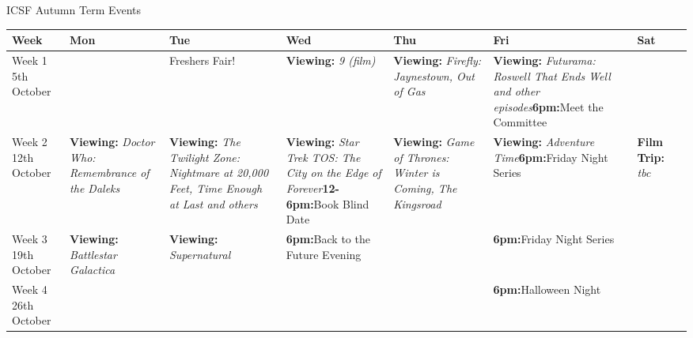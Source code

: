 \begin{landscape}
\noindent

\begin{center}
{\Large ICSF Autumn Term Events}
\end{center}

\scriptsize
\begin{tabular}{p{16mm}|p{31mm}p{31mm}p{31mm}p{31mm}p{31mm}p{31mm}p{0mm}}
		Week & Mon & Tue & Wed & Thu & Fri & Sat\footnotemark[1] & 
	\\
	\hline
		 Week 1 \newline 5th \newline October &
			&
			Freshers Fair!&
			\textbf{Viewing:} \textit{9 (film)}\footnotemark&
			\textbf{Viewing:} \textit{Firefly:} \newline \textit{Jaynestown, Out of Gas}\footnotemark[2]&
			\textbf{Viewing:} \textit{Futurama:} \newline \textit {Roswell That Ends Well and other episodes}\footnotemark[1]\newline\textbf{6pm:}Meet the Committee&
			&
	\\
		 Week 2 \newline 12th \newline October &
			\textbf{Viewing:} \textit{Doctor Who:} \newline \textit {Remembrance of the Daleks}\footnotemark[2]&
			\textbf{Viewing:} \textit{The Twilight Zone: Nightmare at 20,000 Feet, Time Enough at Last and others}\footnotemark[1] &
			\textbf{Viewing:} \textit{Star Trek TOS: The City on the Edge of Forever}\newline\textbf{12-6pm:}Book Blind Date&\footnotemark[1]
			\textbf{Viewing:} \textit{Game of Thrones: Winter is Coming, The Kingsroad}\footnotemark[2]&
			\textbf{Viewing:} \newline \textit{Adventure Time}\footnotemark[2]\newline\textbf{6pm:}Friday Night Series & 
			\textbf{Film Trip:} \textit {tbc}
	\\
		 Week 3 \newline 19th \newline October &
			\textbf{Viewing:} \newline \textit{Battlestar Galactica}\footnotemark[2]&
			\textbf{Viewing:} \newline \textit{Supernatural}\footnotemark[2]&
			\textbf{6pm:}Back to the Future Evening &
			&
			\textbf{6pm:}Friday Night Series&
			&
	\\
		 Week 4 \newline 26th \newline October &
			&
			&
			&
			&
			\textbf{6pm:}\newline Halloween Night&
			&


\end{tabular}
\end{landscape}
